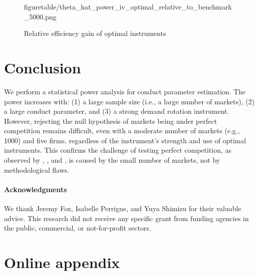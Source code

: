 \documentclass[11pt, a4paper]{article}
\begin{document}
\begin{figure}[!ht]
\begin{center}
{  {figuretable/theta_hat_power_iv_optimal_relative_to_benchmark_5000.png}}
  \caption{Relative efficiency gain of optimal instruments}
  \label{fg:theta_hat_power_iv_optimal_relative_to_benchmark_10000}
  \end{center}
\end{figure} 



\section{Conclusion}

We perform a statistical power analysis for conduct parameter estimation. 
The power increases with: (1) a large sample size (i.e., a large number of markets), (2) a large conduct parameter, and (3) a strong demand rotation instrument. 
However, rejecting the null hypothesis of markets being under perfect competition remains difficult, even with a moderate number of markets (e.g., 1000) and five firms, regardless of the instrument's strength and use of optimal instruments. This confirms the challenge of testing perfect competition, as observed by \cite{genesove1998testing}, \cite{steen1999testing}, and \cite{shaffer1993test}, is caused by the small number of markets, not by methodological flaws.


\paragraph{Acknowledgments}
We thank Jeremy Fox, Isabelle Perrigne, and Yuya Shimizu for their valuable advice. This research did not receive any specific grant from funding agencies in the public, commercial, or not-for-profit sectors. 

\newpage





\newpage

\setcounter{page}{1}
\appendix
\section{Online appendix}\label{sec:appendix}
\end{document}
